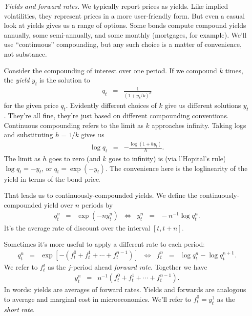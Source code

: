 \documentclass[11pt]{article}
\begin{document}
{\it Yields and forward rates.\/}
We typically report prices as yields.
Like implied volatilities, they represent prices in a more user-friendly form.
But even a casual look at yields gives us a range of options.
Some bonds compute compound yields annually, some semi-annually,
and some monthly (mortgages, for example).
We'll use ``continuous'' compounding, but any such choice is a matter of convenience, not substance.

Consider the compounding of interest over one period.
If we compound $k$ times, the {\it yield\/} $y_t$ is the solution to
\begin{eqnarray*}
    q_t &=& \frac{1} {(1+ y_t/k)^k}
\end{eqnarray*}
for the given price $q_t$.
Evidently different choices of $k$ give us different solutions $y_t$.
They're all fine, they're just based on different compounding conventions.
Continuous compounding refers to the limit as $k$ approaches infinity.
Taking logs and substituting $ h = 1/k$ gives us
\begin{eqnarray*}
    \log q_t &=& - \frac {\log (1+ h y_t)} {h} .
\end{eqnarray*}
The limit as $h$ goes to zero (and $k$ goes to infinity) is (via l'Hopital's rule)
$ \log q_t = - y_t $, or $q_t = \exp(-y_t)$.
The convenience here is the loglinearity of the yield in terms of the bond price.

That leads us to continuously-compounded yields.
We define the continuously-compounded yield over $n$ periods by
\begin{eqnarray}
    q^n_t &=&  \exp(- n y^n_t)
        \;\;\Leftrightarrow\;\;
        y^n_t \;\;=\;\; - n^{-1} \log q^n_t .
        \label{eq:yields}
\end{eqnarray}
It's the average rate of discount over the interval $[t, t+n]$.


Sometimes it's more useful to apply a different
rate to each period:
\begin{eqnarray}
    q^n_t &=&  \exp[- (f^0_t + f^1_t + \cdots + f^{n-1}_t)]
        \;\;\Leftrightarrow\;\;
        f^n_t \;\;=\;\;  \log q^n_t - \log q^{n+1}_t .
        \label{eq:forwards}
\end{eqnarray}
We refer to $f^j_t$ as the $j$-period ahead {\it forward rate\/}.
Together we have
\begin{eqnarray*}
    y^n_t &=&  n^{-1} \left( f^0_t + f^1_t + \cdots + f^{n-1}_t \right).
\end{eqnarray*}
In words:  yields are averages of forward rates.
Yields and forwards are analogous to average and marginal cost in microeconomics.
We'll refer to $f^0_t = y^1_t$ as the {\it short rate\/}.
\end{document}

